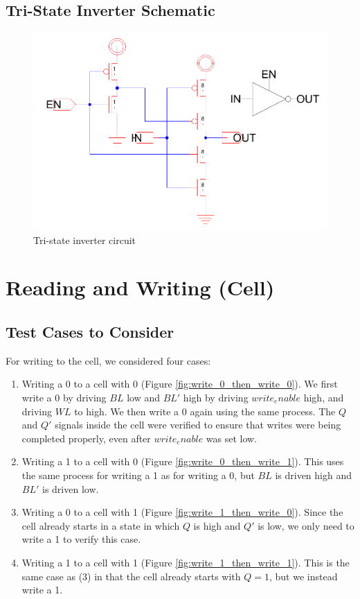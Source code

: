 \documentclass[12pt]{report}
\begin{document}
\subsection*{Tri-State Inverter Schematic}
\begin{figure}[H]
  \centering
    \includegraphics[width=1.0\textwidth]{tristate_inverter_circuit.png}
  \caption{Tri-state inverter circuit}
  \label{fig:tristate_inverter_circuit}
\end{figure}


\section*{Reading and Writing (Cell)}
\subsection*{Test Cases to Consider}
For writing to the cell, we considered four cases:
\begin{enumerate}
\item Writing a 0 to a cell with 0 (Figure \ref{fig:write_0_then_write_0}). We first write a 0 by driving $BL$ low and $BL'$ high by driving $write_enable$ high, and driving $WL$ to high. We then write a 0 again using the same process. The $Q$ and $Q'$ signals inside the cell were verified to ensure that writes were being completed properly, even after $write_enable$ was set low.
\item Writing a 1 to a cell with 0 (Figure \ref{fig:write_0_then_write_1}). This uses the same process for writing a 1 as for writing a 0, but $BL$ is driven high and $BL'$ is driven low.
\item Writing a 0 to a cell with 1 (Figure \ref{fig:write_1_then_write_0}). Since the cell already starts in a state in which $Q$ is high and $Q'$ is low, we only need to write a 1 to verify this case.
\item Writing a 1 to a cell with 1 (Figure \ref{fig:write_1_then_write_1}). This is the same case as (3) in that the cell already starts with $Q = 1$, but we instead write a 1.
\end{enumerate}
\end{document}
